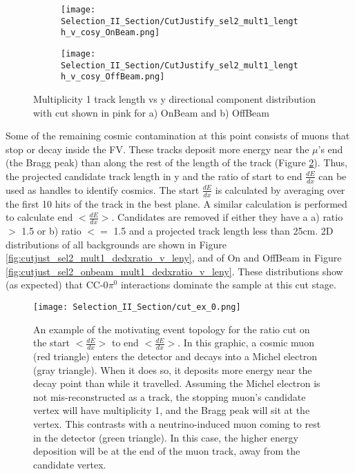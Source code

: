 \begin{figure}[h!]
\centering
  \begin{subfigure}[t]{0.25\textwidth}
    \centering
\texttt{[image: Selection\_II\_Section/CutJustify\_sel2\_mult1\_length\_v\_cosy\_OnBeam.png]}
    \caption{ }
  \end{subfigure} 
  \hspace{20mm}
  \begin{subfigure}[t]{0.25\textwidth}
    \centering
    \texttt{[image: Selection\_II\_Section/CutJustify\_sel2\_mult1\_length\_v\_cosy\_OffBeam.png]}
    \caption{ }
  \end{subfigure} 
\caption{Multiplicity 1 track length vs y directional component distribution with cut shown in pink for a) OnBeam and b) OffBeam }
\label{fig:cutjust_sel2_onbeam_mult1_len_v_cosy}
\end{figure}

\par Some of the remaining cosmic contamination at this point consists of muons that stop or decay inside the FV.  These tracks deposit more energy near the $\mu$'s end (the Bragg peak) than along the rest of the length of the track (Figure \ref{fig:cut_ex_0}). Thus, the projected candidate track length in y and the ratio of start to end $\frac{dE}{dx}$ can be used as handles to identify cosmics. The start $\frac{dE}{dx}$ is calculated by averaging over the first 10 hits of the track in the best plane. A similar calculation is performed to calculate end $<\frac{dE}{dx}>$. Candidates are removed if either they have a a) ratio $>$ 1.5 or b) ratio $<=$ 1.5 and a projected track length less than 25cm.  2D distributions of all backgrounds are shown in Figure \ref{fig:cutjust_sel2_mult1_dedxratio_v_leny}, and of On and OffBeam in Figure \ref{fig:cutjust_sel2_onbeam_mult1_dedxratio_v_leny}. These distributions show (as expected) that CC-0$\pi^0$ interactions dominate the sample at this cut stage.


\begin{figure}[H]
\centering
\texttt{[image: Selection\_II\_Section/cut\_ex\_0.png]}
\caption{An example of the motivating event topology for the ratio cut on the start $<\frac{dE}{dx}>$ to end $<\frac{dE}{dx}>$. In this graphic, a cosmic muon (red triangle) enters the detector and decays into a Michel electron (gray triangle). When it does so, it deposits more energy near the decay point than while it travelled.  Assuming the Michel electron is not mis-reconstructed as a track, the stopping muon’s candidate vertex will have multiplicity 1, and the Bragg peak will sit at the vertex. This contrasts with a neutrino-induced muon coming to rest in the detector (green triangle).  In this case, the higher energy deposition will be at the end of the muon track, away from the candidate vertex. }
\label{fig:cut_ex_0}
\end{figure}


